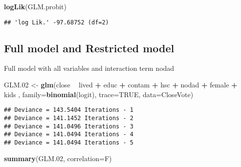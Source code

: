 \documentclass[
]{article}
\newenvironment{Shaded}{\begin{snugshade}}{\end{snugshade}}
\newcommand{\DataTypeTok}[1]{\textcolor[rgb]{0.13,0.29,0.53}{#1}}
\newcommand{\FloatTok}[1]{\textcolor[rgb]{0.00,0.00,0.81}{#1}}
\newcommand{\KeywordTok}[1]{\textcolor[rgb]{0.13,0.29,0.53}{\textbf{#1}}}
\newcommand{\NormalTok}[1]{#1}
\newcommand{\OperatorTok}[1]{\textcolor[rgb]{0.81,0.36,0.00}{\textbf{#1}}}
\newcommand{\OtherTok}[1]{\textcolor[rgb]{0.56,0.35,0.01}{#1}}
\newcommand{\StringTok}[1]{\textcolor[rgb]{0.31,0.60,0.02}{#1}}
\begin{document}
\begin{Shaded}
\begin{Highlighting}[]
\KeywordTok{logLik}\NormalTok{(GLM.probit)}
\end{Highlighting}
\end{Shaded}

\begin{verbatim}
## 'log Lik.' -97.68752 (df=2)
\end{verbatim}

\hypertarget{full-model-and-restricted-model}{%
\subsection{Full model and Restricted
model}\label{full-model-and-restricted-model}}

Full model with all variables and interaction term nodad

\begin{Shaded}
\begin{Highlighting}[]
\NormalTok{GLM}\FloatTok{.02}\NormalTok{ <-}\StringTok{ }\KeywordTok{glm}\NormalTok{(close }\OperatorTok{~}\StringTok{ }\NormalTok{lived }\OperatorTok{+}\StringTok{ }\NormalTok{educ }\OperatorTok{+}\StringTok{ }\NormalTok{contam }\OperatorTok{+}\StringTok{ }\NormalTok{hsc }\OperatorTok{+}\StringTok{ }\NormalTok{nodad }\OperatorTok{+}\StringTok{ }\NormalTok{female }\OperatorTok{+}\StringTok{ }\NormalTok{kids ,}
              \DataTypeTok{family=}\KeywordTok{binomial}\NormalTok{(logit), }\DataTypeTok{trace=}\OtherTok{TRUE}\NormalTok{, }\DataTypeTok{data=}\NormalTok{CloseVote)}
\end{Highlighting}
\end{Shaded}

\begin{verbatim}
## Deviance = 143.5404 Iterations - 1
## Deviance = 141.1452 Iterations - 2
## Deviance = 141.0496 Iterations - 3
## Deviance = 141.0494 Iterations - 4
## Deviance = 141.0494 Iterations - 5
\end{verbatim}

\begin{Shaded}
\begin{Highlighting}[]
\KeywordTok{summary}\NormalTok{(GLM}\FloatTok{.02}\NormalTok{, }\DataTypeTok{correlation=}\NormalTok{F)}
\end{Highlighting}
\end{Shaded}
\end{document}
